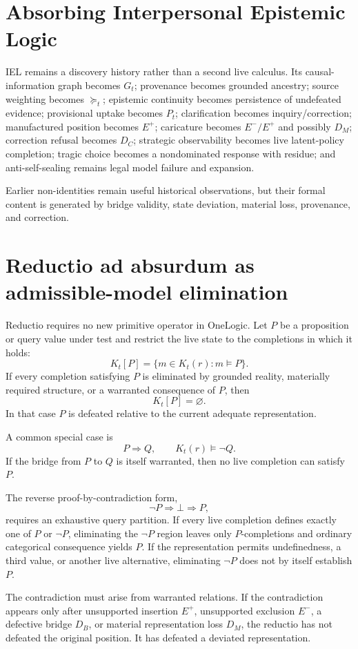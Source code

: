 \documentclass[11pt]{article}
\begin{document}
\section{Absorbing Interpersonal Epistemic Logic}
IEL remains a discovery history rather than a second live calculus. Its causal-information graph becomes $G_t$; provenance becomes grounded ancestry; source weighting becomes $\succeq_t$; epistemic continuity becomes persistence of undefeated evidence; provisional uptake becomes $P_t$; clarification becomes inquiry/correction; manufactured position becomes $E^+$; caricature becomes $E^-/E^+$ and possibly $D_M$; correction refusal becomes $D_C$; strategic observability becomes live latent-policy completion; tragic choice becomes a nondominated response with residue; and anti-self-sealing remains legal model failure and expansion.

Earlier non-identities remain useful historical observations, but their formal content is generated by bridge validity, state deviation, material loss, provenance, and correction.


\section{Reductio ad absurdum as admissible-model elimination}
Reductio requires no new primitive operator in OneLogic. Let $P$ be a proposition or query value under test and restrict the live state to the completions in which it holds:
\[
K_t[P]=\{m\in K_t(r):m\models P\}.
\]
If every completion satisfying $P$ is eliminated by grounded reality, materially required structure, or a warranted consequence of $P$, then
\[
K_t[P]=\varnothing.
\]
In that case $P$ is defeated relative to the current adequate representation.

A common special case is
\[
P\Rightarrow Q,
\qquad K_t(r)\models \neg Q.
\]
If the bridge from $P$ to $Q$ is itself warranted, then no live completion can satisfy $P$.

The reverse proof-by-contradiction form,
\[
\neg P\Rightarrow\bot\Rightarrow P,
\]
requires an exhaustive query partition. If every live completion defines exactly one of $P$ or $\neg P$, eliminating the $\neg P$ region leaves only $P$-completions and ordinary categorical consequence yields $P$. If the representation permits undefinedness, a third value, or another live alternative, eliminating $\neg P$ does not by itself establish $P$.

The contradiction must arise from warranted relations. If the contradiction appears only after unsupported insertion $E^+$, unsupported exclusion $E^-$, a defective bridge $D_B$, or material representation loss $D_M$, the reductio has not defeated the original position. It has defeated a deviated representation.
\end{document}
